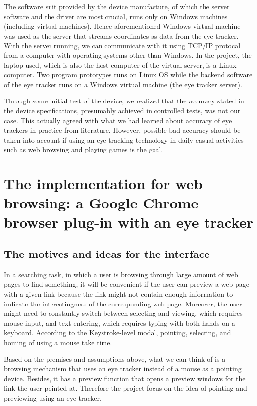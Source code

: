 \documentclass[english]{tktltiki}
\begin{document}
The software suit provided by the device manufacture, of which the server software and the driver are most crucial, runs only on Windows machines (including virtual machines). Hence aforementioned Windows virtual machine was used as the server that streams coordinates as data from the eye tracker. With the server running, we can communicate with it using TCP/IP protocal from a computer with operating systems other than Windows. In the project, the laptop used, which is also the host computer of the virtual server, is a Linux computer. Two program prototypes runs on Linux OS while the backend software of the eye tracker runs on a Windows virtual machine (the eye tracker server).

Through some initial test of the device, we realized that the accuracy stated in the device specifications, presumably achieved in controlled tests, was not our case. This actually agreed with what we had learned about accuracy of eye trackers in practice from literature. \cite{majaranta14} However, possible bad accuracy should be taken into account if using an eye tracking technology in daily casual activities such as web browsing and playing games is the goal. 


\section{The implementation for web browsing: a Google Chrome browser plug-in with an eye tracker}


\subsection{The motives and ideas for the interface}  

In a searching task, in which a user is browsing through large amount of web pages to find something, it will be convenient if the user can preview a web page with a given link because the link might not contain enough information to indicate the interestingness of the corresponding web page. Moreover, the user might need to constantly switch between selecting and viewing, which requires mouse input, and text entering, which requires typing with both hands on a keyboard. According to the Keystroke-level modal\cite{Card:1980:KMU:358886.358895}, pointing, selecting, and homing of using a mouse take time.

Based on the premises and assumptions above, what we can think of is a browsing mechanism that uses an eye tracker instead of a mouse as a pointing device. Besides, it has a preview function that opens a preview windows for the link the user pointed at. Therefore the project focus on the idea of pointing and previewing using an eye tracker.  
\end{document}
